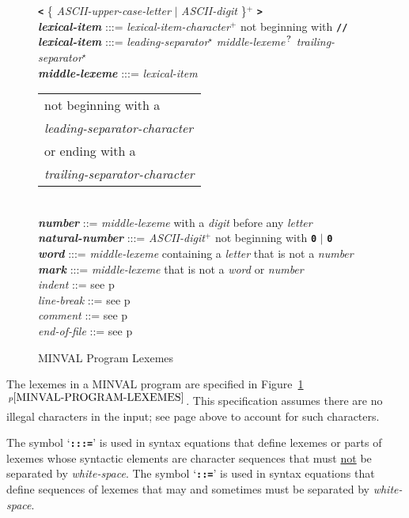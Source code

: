 \documentclass[12pt]{article}
\newcommand{\TT}[1]{{\tt \bfseries #1}}
\newcommand{\STAR}{{\Large $^\star$}}
\newcommand{\PLUS}[1][]{{$^{+#1}$}}
\newcommand{\QMARK}{{$^{\,\mbox{\footnotesize ?}}$}}
\newcommand{\ttkey}[1]{{\tt \bfseries #1}}
\newcommand{\emkey}[1]{{\em \bfseries #1}}
\newcommand{\itemref}[1]{\ref{#1}$\,^{p\pageref{#1}}$}
\newcommand{\pagref}[1]{p\pageref{#1}}
\newlength{\figurewidth}
\newenvironment{boxedfigure}[1][!btp]%
	{\begin{figure*}[#1]
	 \begin{lrbox}{\figurebox}
	 \begin{minipage}{\figurewidth}

	 \vspace*{1ex}}%
	{
	 \vspace*{1ex}

	 \end{minipage}
	 \end{lrbox}

	 \vspace*{-15ex}
	 \centering
	 \fbox{\hspace*{0.1in}\usebox{\figurebox}\hspace*{0.1in}}
	 \end{figure*}}
\newenvironment{indpar}[1][0.3in]%
	{\begin{list}{}%
		     {\setlength{\itemsep}{0in}%
		      \setlength{\topsep}{0in}%
		      \setlength{\parsep}{1ex}%
		      \setlength{\labelwidth}{#1}%
		      \setlength{\leftmargin}{#1}%
		      \addtolength{\leftmargin}{\labelsep}}%
	 \item}%
	{\end{list}}
\begin{document}
\begin{boxedfigure}[!p]
\begin{indpar}
\hspace*{0.5in}
    \TT{<} \{ {\em ASCII-upper-case-letter} $|$ {\em ASCII-digit}
            \}\PLUS{} \TT{>}
\\[1ex]
\emkey{lexical-item} :::= {\em lexical-item-character}\PLUS{}
                       not beginning with \TT{//}
\\[0.5ex]
\emkey{lexical-item} :::= {\em leading-separator}\STAR{}
			  {\em middle-lexeme}\QMARK{}
                          {\em trailing-separator}\STAR{}
\\[0.5ex]
\emkey{middle-lexeme} :::= 
	{\em lexical-item}
	\begin{tabular}[t]{@{}l@{}}
	not beginning with a \\
	{\em leading-separator-character} \\
	or ending with a \\
	{\em trailing-separator-character} \\
	\end{tabular}
\\[0.5ex]
\emkey{number}
    ::= {\em middle-lexeme} with a {\em digit} before any {\em letter}
\\[0.5ex]
\emkey{natural-number}\label{NATURAL-NUMBER}
	:::= {\em ASCII-digit}\PLUS{} not beginning with \TT{0} $|$ \TT{0}
\\[0.5ex]
\emkey{word} :::= {\em middle-lexeme} containing a {\em letter} that is not
                  a {\em number}
\\[0.5ex]
\emkey{mark} :::= {\em middle-lexeme} that is not a {\em word} or
		  {\em number}
\\[0.5ex]
{\em indent} ::= see \pagref{INDENT}
\\[0.5ex]
{\em line-break} ::= see \pagref{LINE-BREAK}
\\[0.5ex]
{\em comment} ::= see \pagref{COMMENT}
\\[0.5ex]
{\em end-of-file} ::= see \pagref{END-OF-FILE}

\end{indpar}
\caption{MINVAL Program Lexemes}
\label{MINVAL-PROGRAM-LEXEMES}
\end{boxedfigure}

The lexemes in a MINVAL program are specified in
Figure~\itemref{MINVAL-PROGRAM-LEXEMES}.  This specification assumes there
are no illegal characters in the input; see page \pageref{ILLEGAL-CHARACTERS}
above to account for such characters.

The symbol `\ttkey{:::=}' is used in syntax equations
that define lexemes or parts of lexemes whose syntactic elements are
character sequences that must \underline{not} be separated by {\em white-space}.
The symbol `\ttkey{::=}'
is used in syntax equations that define sequences of lexemes that may
and sometimes must be separated by {\em white-space}.
\end{document}
